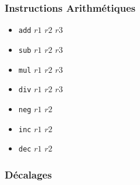 \documentclass[french, 12pt]{article}
\begin{document}
\subsubsection*{Instructions Arithmétiques}

\begin{itemize}
      \item \verb|add| $r1$ $r2$ $r3$
      \item \verb|sub| $r1$ $r2$ $r3$
      \item \verb|mul| $r1$ $r2$ $r3$
      \item \verb|div| $r1$ $r2$ $r3$
      \item \verb|neg| $r1$ $r2$
      \item \verb|inc| $r1$ $r2$
      \item \verb|dec| $r1$ $r2$
\end{itemize}

\subsubsection*{Décalages}

\end{document}
